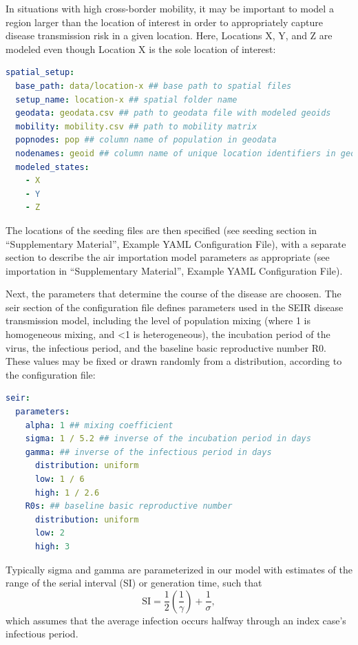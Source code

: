 {In situations with high cross-border mobility, it may be important to model a region larger than the location of interest in order to appropriately capture disease transmission risk in a given location. Here, Locations X, Y, and Z are modeled even though Location X is the sole location of interest:
\begin{lstlisting}[language=yaml]
spatial_setup: 
  base_path: data/location-x ## base path to spatial files 
  setup_name: location-x ## spatial folder name 
  geodata: geodata.csv ## path to geodata file with modeled geoids 
  mobility: mobility.csv ## path to mobility matrix 
  popnodes: pop ## column name of population in geodata 
  nodenames: geoid ## column name of unique location identifiers in geodata 
  modeled_states: 
    - X 
    - Y 
    - Z
\end{lstlisting}

The locations of the seeding files are then specified (see seeding section in “Supplementary Material”, Example YAML Configuration File), with a separate section to describe the air importation model parameters as appropriate (see importation in “Supplementary Material”, Example YAML Configuration File).

Next, the parameters that determine the course of the disease are choosen. The seir section of the configuration file defines parameters used in the SEIR disease transmission model, including the level of population mixing (where 1 is homogeneous mixing, and <1 is heterogeneous), the incubation period of the virus, the infectious period, and the baseline basic reproductive number R0. These values may be fixed or drawn randomly from a distribution, according to the configuration file:
\begin{lstlisting}[language=yaml]
seir: 
  parameters: 
    alpha: 1 ## mixing coefficient 
    sigma: 1 / 5.2 ## inverse of the incubation period in days 
    gamma: ## inverse of the infectious period in days 
      distribution: uniform 
      low: 1 / 6 
      high: 1 / 2.6 
    R0s: ## baseline basic reproductive number 
      distribution: uniform 
      low: 2 
      high: 3
\end{lstlisting}

Typically sigma and gamma are parameterized in our model with estimates of the range of the serial interval (SI) or generation time, such that
\begin{equation}
\text{SI}=\frac{1}{2}\left(\frac{1}{\gamma }\right)+\frac{1}{\sigma },
\end{equation}
which assumes that the average infection occurs halfway through an index case’s infectious period.

}
